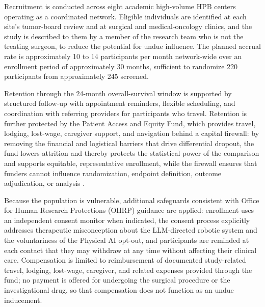 Recruitment is conducted across eight academic high-volume HPB centers operating as
a coordinated network. Eligible individuals are identified at each site's tumor-board
review and at surgical and medical-oncology clinics, and the study is described to
them by a member of the research team who is not the treating surgeon, to reduce the
potential for undue influence. The planned accrual rate is approximately 10 to 14
participants per month network-wide over an enrollment period of approximately 30
months, sufficient to randomize 220 participants from approximately 245 screened.

Retention through the 24-month overall-survival window is supported by structured
follow-up with appointment reminders, flexible scheduling, and coordination with
referring providers for participants who travel. Retention is further protected by
the Patient Access and Equity Fund, which provides travel, lodging, lost-wage,
caregiver support, and navigation behind a capital firewall: by removing the
financial and logistical barriers that drive differential dropout, the fund lowers
attrition and thereby protects the statistical power of the comparison and supports
equitable, representative enrollment, while the firewall ensures that funders cannot
influence randomization, endpoint definition, outcome adjudication, or analysis
\cite{kawchak2026hr9510,ecfr2026part54}. 

\clearpage

Because the population is vulnerable,
additional safeguards consistent with Office for Human Research Protections (OHRP)
guidance are applied: enrollment uses an independent consent monitor when indicated,
the consent process explicitly addresses therapeutic misconception about the
LLM-directed robotic system and the voluntariness of the Physical AI opt-out, and
participants are reminded at each contact that they may withdraw at any time without
affecting their clinical care. Compensation is limited to reimbursement of
documented study-related travel, lodging, lost-wage, caregiver, and related expenses
provided through the fund; no payment is offered for undergoing the surgical
procedure or the investigational drug, so that compensation does not function as an
undue inducement.

